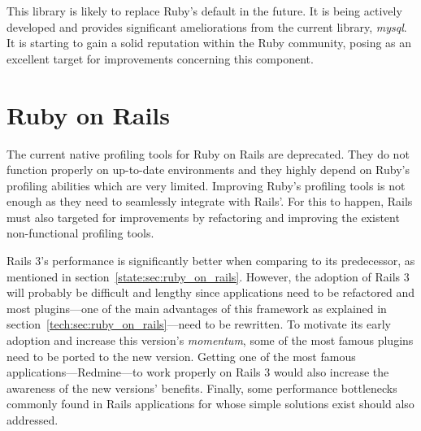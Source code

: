 This library is likely to replace Ruby's default in the future. It is being actively developed and provides significant ameliorations from the current library, \textit{mysql}. It is starting to gain a solid reputation within the Ruby community, posing as an excellent target for improvements concerning this component.

\section{Ruby on Rails}
The current native profiling tools for Ruby on Rails are deprecated. They do not function properly on up-to-date environments and they highly depend on Ruby's profiling abilities which are very limited. Improving Ruby's profiling tools is not enough as they need to seamlessly integrate with Rails'. For this to happen, Rails must also targeted for improvements by refactoring and improving the existent non-functional profiling tools.

Rails 3's performance is significantly better when comparing to its predecessor, as mentioned in section~\ref{state:sec:ruby_on_rails}. However, the adoption of Rails 3 will probably be difficult and lengthy since applications need to be refactored and most plugins---one of the main advantages of this framework as explained in section~\ref{tech:sec:ruby_on_rails}---need to be rewritten. To motivate its early adoption and increase this version's \textit{momentum}, some of the most famous plugins need to be ported to the new version. Getting one of the most famous applications---Redmine---to work properly on Rails 3 would also increase the awareness of the new versions' benefits. Finally, some performance bottlenecks commonly found in Rails applications for whose simple solutions exist should also addressed.

\begin{comment}
Rails scalability should be easily accessible to everyone

Improve existing tools, create/improve measurement tools

Missing performance-oriented guidelines and conventions

Missing and out-dated tools to profile Rails applications

Optimal configurations and setups
\end{comment}
